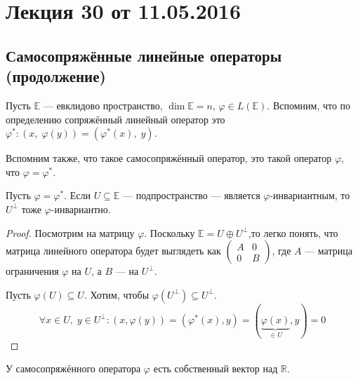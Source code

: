 


\section{Лекция 30 от 11.05.2016}

\subsection*{Самосопряжённые линейные операторы (продолжение)}

Пусть $\mathbb{E}$ --- евклидово пространство, $\dim \mathbb{E} = n$, $\varphi \in L(\mathbb{E})$. Вспомним, что по определению сопряжённый линейный оператор это $\varphi^*\colon (x,\;\varphi(y)) = (\varphi^*(x),\; y)$.

\par Вспомним также, что такое самосопряжённый оператор, это такой оператор $\varphi$, что $\varphi = \varphi^*$.

\begin{Suggestion}
	Пусть $\varphi = \varphi^*$. Если $U \subseteq \mathbb{E}$ --- подпространство --- является $\varphi$-инвариантным, то $U^\perp$ тоже $\varphi$-инвариантно.
\end{Suggestion}

\begin{proof}
	 Посмотрим на матрицу $\varphi$. Поскольку $\mathbb{E} = U \oplus U^\perp$,то легко понять, что матрица линейного оператора будет выглядеть как $\begin{pmatrix}
		A& 0\\
		0& B
	\end{pmatrix}$, где $A$ --- матрица ограничения $\varphi$ на $U$, а $B$ --- на $U^\perp$.
	
	\par Пусть $\varphi(U) \subseteq U$. Хотим, чтобы $\varphi(U^\perp) \subseteq U^\perp$. 
	\[
		\forall x \in U,\; y \in U^\perp\colon (x,\varphi(y)) = (\varphi^*(x), y) = (\underbrace{\varphi(x)}_{\in U}, y) = 0
	\]
\end{proof}

\begin{Suggestion}
	У самосопряжённого оператора $\varphi$ есть собственный вектор над $\mathbb{R}$. 
\end{Suggestion}

